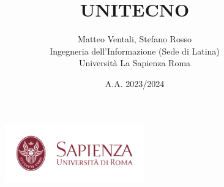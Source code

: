 \documentclass[a4paper, 14pt]{article}
\date{A.A. 2023/2024}
\title{\Huge {\textbf{UNITECNO}}}
\author{\Large Matteo Ventali, Stefano Rosso \\ \Large Ingegneria dell'Informazione (Sede di Latina) \\ \Large Università La Sapienza Roma }
\begin{document}
	\begin{figure}[t]
		\includegraphics[width=60mm]{logo.png}
	\end{figure}
	
	\maketitle	
	
	\newpage
	\tableofcontents
	
	\newpage
\end{document}
